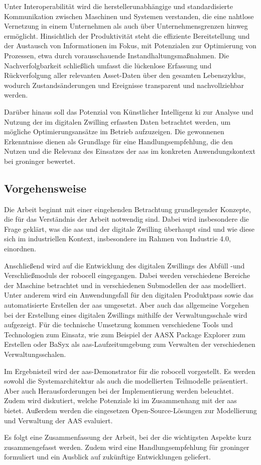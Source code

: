 Unter Interoperabilität wird die herstellerunabhängige und standardisierte Kommunikation zwischen Maschinen und Systemen verstanden, die eine nahtlose Vernetzung in einem Unternehmen als auch über Unternehmensgrenzen hinweg ermöglicht.
Hinsichtlich der Produktivität steht die effiziente Bereitstellung und der Austausch von Informationen im Fokus, mit Potenzialen zur Optimierung von Prozessen, etwa durch vorausschauende Instandhaltungsmaßnahmen. 
Die Nachverfolgbarkeit schließlich umfasst die lückenlose Erfassung und Rückverfolgung aller relevanten Asset-Daten über den gesamten Lebenszyklus, wodurch Zustandsänderungen und Ereignisse transparent und nachvollziehbar werden.

Darüber hinaus soll das Potenzial von Künstlicher Intelligenz \acs{ki} zur Analyse und Nutzung der im digitalen Zwilling erfassten Daten betrachtet werden, um mögliche Optimierungsansätze im Betrieb aufzuzeigen.
Die gewonnenen Erkenntnisse dienen als Grundlage für eine Handlungsempfehlung, die den Nutzen und die Relevanz des Einsatzes der \acs{aas} im konkreten Anwendungskontext bei groninger bewertet.

\subsection{Vorgehensweise}
Die Arbeit beginnt mit einer eingehenden Betrachtung grundlegender Konzepte, die für das Verständnis der Arbeit notwendig sind. 
Dabei wird insbesondere die Frage geklärt, was die \acs{aas} und der digitale Zwilling überhaupt sind und wie diese sich im industriellen Kontext, insbesondere im Rahmen von Industrie 4.0, einordnen.

Anschließend wird auf die Entwicklung des digitalen Zwillings des Abfüll -und Verschließmoduls der robocell eingegangen. 
Dabei werden verschiedene Bereiche der Maschine betrachtet und in verschiedenen Submodellen der \acs{aas} modelliert.
Unter anderem wird ein Anwendungsfall für den digitalen Produktpass sowie das automatisierte Erstellen der \acs{aas} umgesetzt.
Aber auch das allgemeine Vorgehen bei der Erstellung eines digitalen Zwillings mithilfe der Verwaltungsschale wird aufgezeigt.
Für die technische Umsetzung kommen verschiedene Tools und Technologien zum Einsatz, wie zum Beispiel der AASX Package Explorer zum Erstellen oder BaSyx als \acs{aas}-Laufzeitumgebung zum Verwalten der verschiedenen Verwaltungsschalen.

Im Ergebnisteil wird der \acs{aas}-Demonstrator für die robocell vorgestellt. Es werden sowohl die Systemarchitektur als auch die modellierten Teilmodelle präsentiert.
Aber auch Herausforderungen bei der Implementierung werden beleuchtet.
Zudem wird diskutiert, welche Potenziale \ac{ki} im Zusammenhang mit der \acs{aas} bietet.
Außerdem werden die eingesetzen Open-Source-Lösungen zur Modellierung und Verwaltung der AAS evaluiert.

Es folgt eine Zusammenfassung der Arbeit, bei der die wichtigsten Aspekte kurz zusammengefasst werden.
Zudem wird eine Handlungsempfehlung für groninger formuliert und ein Ausblick auf zukünftige Entwicklungen geliefert.
